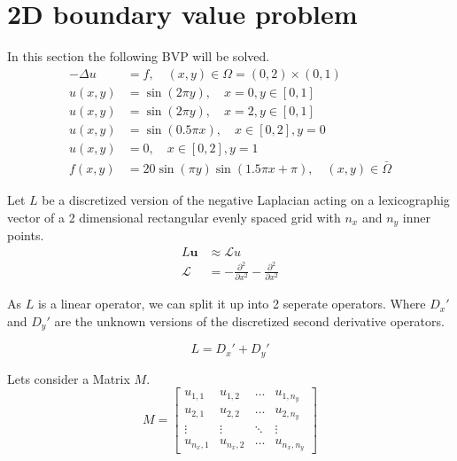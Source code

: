 \documentclass{article}
\begin{document}
\section{2D boundary value problem}
In this section the following BVP will be solved.
\begin{equation}
\begin{aligned}-\Delta u &=f, \quad(x, y) \in \Omega=(0,2) \times(0,1) \\ u(x, y) &=\sin (2 \pi y), \quad x=0, y \in[0,1] \\ u(x, y) &=\sin (2 \pi y), \quad x=2, y \in[0,1] \\ u(x, y) &=\sin (0.5 \pi x), \quad x \in[0,2], y=0 \\ u(x, y) &=0, \quad x \in[0,2], y=1 \\ f(x, y) &=20 \sin (\pi y) \sin (1.5 \pi x+\pi), \quad(x, y) \in \bar{\Omega} \end{aligned}
\end{equation}

    
Let $L$ be a discretized version of the negative Laplacian acting on a lexicographig vector of a 2 dimensional rectangular evenly spaced grid with $n_x$ and $n_y$ inner points.
\begin{align}
    L\mathbf{u} &\approx \mathcal{L} u\\
    \mathcal{L} &= -\frac{\partial^2}{\partial x^2} - \frac{\partial^2}{\partial x^2}
\end{align}

As $L$ is a linear operator, we can split it up into 2 seperate operators. Where $D_x'$ and $D_y'$ are the unknown versions of the discretized second derivative operators.

\begin{equation}
    L = D_x' + D_y'
\end{equation}

Lets consider a Matrix $M$.
\begin{equation}
    M = \begin{bmatrix}
        u_{1,1} & u_{1,2} & \dots & u_{1,n_y} \\
        u_{2,1} & u_{2,2} & \dots & u_{2,n_y} \\
        \vdots & \vdots & \ddots & \vdots \\
        u_{n_x,1} & u_{n_x,2} & \dots & u_{n_x,n_y}
    \end{bmatrix}
\end{equation}
\end{document}
